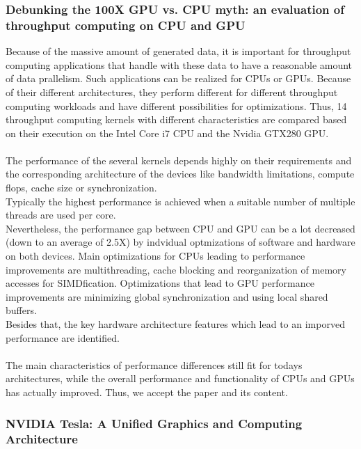 \documentclass[12pt]{article}
\begin{document}
\subsubsection*{Debunking the 100X GPU vs. CPU myth: an evaluation of throughput computing on CPU and GPU}
Because of the massive amount of generated data, it is important for throughput computing applications that handle with these data to have a reasonable amount of data prallelism. Such applications can be realized for CPUs or GPUs. Because of their different architectures, they perform different for different throughput computing workloads and have different possibilities for optimizations. Thus, 14 throughput computing kernels with different characteristics are compared based on their execution on the Intel Core i7 CPU and the Nvidia GTX280 GPU.\\\\
The performance of the several kernels depends highly on their requirements and the corresponding architecture of the devices like bandwidth limitations, compute flops, cache size or synchronization.\\
Typically the highest performance is achieved when a suitable number of multiple threads are used per core.\\
Nevertheless, the performance gap between CPU and GPU can be a lot decreased (down to an average of 2.5X) by indvidual optmizations of software and hardware on both devices. Main optimizations for CPUs leading to performance improvements are multithreading, cache blocking and reorganization of memory accesses for SIMDfication. Optimizations that lead to GPU performance improvements are minimizing global synchronization and using local shared buffers.\\
Besides that, the key hardware architecture features which lead to an imporved performance are identified.\\\\
The main characteristics of performance differences still fit for todays architectures, while the overall performance and functionality of CPUs and GPUs has actually improved. Thus, we accept the paper and its content.

\vspace{10pt}


\subsubsection*{NVIDIA Tesla: A Unified Graphics and Computing Architecture}
\end{document}
